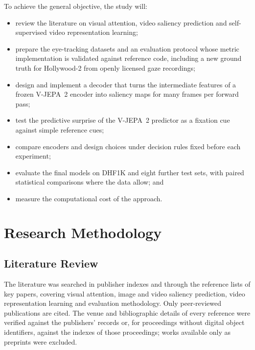 To achieve the general objective, the study will:
\begin{itemize}
  \item review the literature on visual attention, video saliency prediction and
    self-supervised video representation learning;
  \item prepare the eye-tracking datasets and an evaluation protocol whose metric
    implementation is validated against reference code, including a new
    ground truth for Hollywood-2 from openly licensed gaze recordings;
  \item design and implement a decoder that turns the intermediate features of a
    frozen \acrshort{V-JEPA}~2 encoder into saliency maps for many frames per forward pass;
  \item test the predictive surprise of the \acrshort{V-JEPA}~2 predictor as a fixation
    cue against simple reference cues;
  \item compare encoders and design choices under decision rules fixed before
    each experiment;
  \item evaluate the final models on DHF1K and eight further test sets, with
    paired statistical comparisons where the data allow; and
  \item measure the computational cost of the approach.
\end{itemize}

\section{Research Methodology}\label{sec:methodology-overview}


\subsection{Literature Review}
The literature was searched in publisher indexes and through the reference
lists of key papers, covering visual attention, image and video saliency
prediction, video representation learning and evaluation methodology. Only
peer-reviewed publications are cited. The venue and bibliographic details of
every reference were verified against the publishers' records or, for
proceedings without digital object identifiers, against the indexes of those
proceedings; works available only as preprints were excluded.

